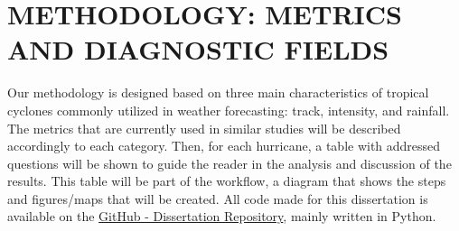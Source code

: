 \chapter{METHODOLOGY: METRICS AND DIAGNOSTIC FIELDS}
\label{ch:methods}



Our methodology is designed based on three main characteristics of tropical cyclones commonly utilized in weather forecasting: track, intensity, and rainfall. The metrics that are currently used in similar studies will be described accordingly to each category. Then, for each hurricane, a table with addressed questions will be shown to guide the reader in the analysis and discussion of the results. This table will be part of the workflow, a diagram that shows the steps and figures/maps that will be created. 
All code made for this dissertation is available on the
\href{https://github.com/biancafusi/Dissertation}{GitHub - Dissertation Repository}, mainly written in Python.

\begin{center}
 \label{tab:questions}
\end{center}

